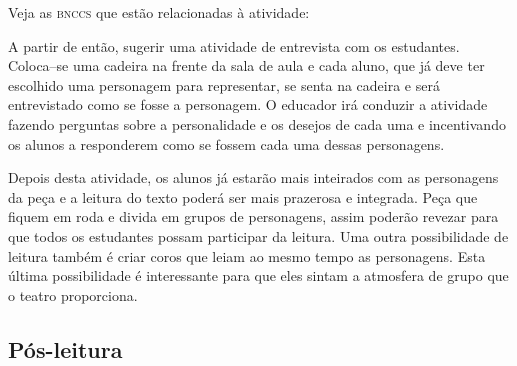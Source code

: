 \documentclass[11pt]{extarticle}
\begin{document}
Veja as \textsc{bnccs} que estão relacionadas à atividade:


A partir de então, sugerir uma atividade de entrevista com os estudantes. Coloca–se uma cadeira na frente da sala de aula e cada aluno, que já deve ter escolhido uma personagem para representar, se senta na cadeira e será entrevistado como se fosse a personagem. O educador irá conduzir a atividade fazendo perguntas sobre a personalidade e os desejos de cada uma e incentivando os alunos a responderem como se fossem cada uma dessas personagens.


Depois desta atividade, os alunos já estarão mais inteirados com as personagens da peça e a leitura do texto poderá ser mais prazerosa e integrada. Peça que fiquem em roda e divida em grupos de personagens, assim poderão revezar para que todos os estudantes possam participar da leitura. Uma outra possibilidade de leitura também é criar coros que leiam ao mesmo tempo as personagens. Esta última possibilidade é interessante para que eles sintam a atmosfera de grupo que o teatro proporciona.

\subsection{Pós-leitura} 

\end{document}
